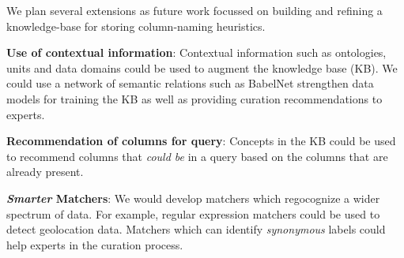 We plan several extensions as future work focussed on building and refining a knowledge-base for storing column-naming heuristics. 

\begin{itemize*}
  \item \textbf{Use of contextual information}:  Contextual information such as ontologies, units  and data domains could be used to augment the \systemname knowledge base (KB). We could use a network of semantic relations such as BabelNet strengthen data models for training the KB as well as providing curation recommendations to experts.~\cite{babelnet} 
  \item \textbf{Recommendation of columns for query}: Concepts in the KB could be used to recommend columns that \textit{could be} in a query based on the columns that are already present.
  \item \textbf{\textit{Smarter} Matchers}: We would develop matchers which regocognize a wider spectrum of data. For example, regular expression matchers could be used to detect geolocation data. Matchers which can identify \textit{synonymous} labels could help experts in the curation process. 
\end{itemize*}